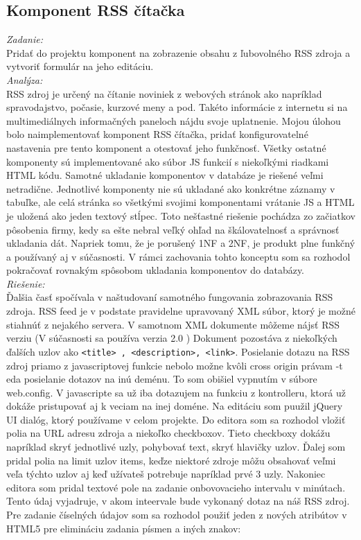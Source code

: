 \documentclass[11pt, oneside]{report}
\begin{document}
\subsection*{Komponent RSS čítačka}
\textit{Zadanie:}\\
Pridať do projektu  komponent na zobrazenie obsahu z ľubovolného RSS zdroja a vytvoriť formulár na jeho editáciu.
\\\textit{Analýza:}\\
 RSS zdroj   je určený na čítanie noviniek  z webových stránok ako napríklad spravodajstvo, počasie, kurzové meny a pod. Takéto informácie  z internetu si na multimediálnych informačných paneloch nájdu svoje uplatnenie. Mojou úlohou bolo naimplementovať komponent RSS čítačka, pridať  konfigurovatelné nastavenia pre tento komponent a otestovať jeho funkčnosť.
Všetky ostatné komponenty sú implementované ako súbor JS funkcií s niekoľkými riadkami HTML kódu. Samotné ukladanie komponentov v databáze je riešené veľmi netradične. Jednotlivé komponenty nie sú ukladané ako konkrétne záznamy v tabuľke, ale celá stránka  so všetkými svojimi komponentami vrátanie JS a HTML je uložená ako jeden textový stĺpec. Toto nešťastné riešenie  pochádza  zo začiatkov pôsobenia firmy, kedy sa ešte nebral veľký ohľad na  škálovatelnosť a  správnosť ukladania dát. 
Napriek tomu, že je porušený 1NF a 2NF, je produkt plne funkčný a používaný aj v súčasnosti. V rámci zachovania tohto konceptu som sa rozhodol pokračovať rovnakým spôsobom ukladania komponentov do databázy.
\\\textit{Riešenie:}\\
Ďalšia časť spočívala v naštudovaní samotného fungovania zobrazovania RSS zdroja. RSS feed je v podstate pravidelne upravovaný XML súbor, ktorý je možné stiahnúť z nejakého servera. V samotnom XML dokumente môžeme nájsť RSS verziu (V súčasnosti sa používa verzia 2.0 ) Dokument pozostáva z niekoľkých ďalších uzlov ako \lstset{language=XML}
\lstinline!<title> , <description>, <link>!. Posielanie dotazu na RSS zdroj priamo z javascriptovej funkcie nebolo možne kvôli cross origin právam -t eda posielanie  dotazov na inú deménu. To som obišiel vypnutím v súbore web.config. V javascripte sa už iba dotazujem na funkciu z kontrolleru, ktorá  už dokáže pristupovať aj k veciam  na inej doméne. Na editáciu som puužil jQuery UI dialóg, ktorý používame v celom projekte. Do editora som sa rozhodol vložiť polia na URL adresu zdroja a niekoľko checkboxov. Tieto checkboxy dokážu napríklad skryť jednotlivé  uzly,  pohybovať text, skryť hlavičky uzlov. Ďalej som pridal polia na limit uzlov items, keďze niektoré zdroje môžu obsahovať veľmi veľa týchto uzlov aj keď užívateš potrebuje napríklad prvé 3 uzly. Nakoniec editora som pridal textové pole na zadanie onbovovacieho intervalu v minútach. Tento údaj vyjadruje, v akom inteervale bude vykonaný dotaz na náš RSS zdroj. Pre zadanie číselných údajov som sa rozhodol použiť jeden z nových atribútov  v HTML5 pre elimináciu zadania písmen a iných znakov:
\end{document}
